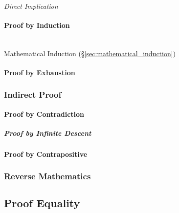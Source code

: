 \emph{Direct Implication}



\paragraph{Proof by Induction}\label{sec:induction_proof}
\hfill \\

Mathematical Induction (\S\ref{sec:mathematical_induction})



\paragraph{Proof by Exhaustion}\label{sec:exhaustion_proof}



\subsubsection{Indirect Proof}\label{sec:indirect_proof}

\paragraph{Proof by Contradiction}\label{sec:contradiction_proof}

\subparagraph{Proof by Infinite Descent}\label{sec:infinite_descent}

\paragraph{Proof by Contrapositive}\label{sec:contrapositive_proof}



\subsubsection{Reverse Mathematics}\label{sec:reverse_mathematics}



\subsection{Proof Equality}\label{sec:proof_equality}
\cite{harper12}

